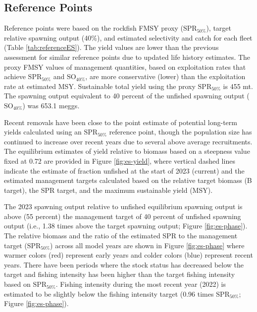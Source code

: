 \documentclass[11pt,
  english,
  letterpaper,
]{article}
\begin{document}
\hypertarget{reference-points}{%
\subsection*{Reference Points}\label{reference-points}}

Reference points were based on the rockfish FMSY proxy (\(\text{SPR}_{50\%}\)), target relative spawning output (40\%), and estimated selectivity and catch for each fleet (Table \ref{tab:referenceES}). The yield values are lower than the previous assessment for similar reference points due to updated life history estimates. The proxy FMSY values of management quantities, based on exploitation rates that achieve \(\text{SPR}_{50\%}\) and \(\text{SO}_{40\%}\), are more conservative (lower) than the exploitation rate at estimated MSY. Sustainable total yield using the proxy \(\text{SPR}_{50\%}\) is 455 mt. The spawning output equivalent to 40 percent of the unfished spawning output (\(\text{SO}_{40\%}\)) was 653.1 meggs.

Recent removals have been close to the point estimate of potential long-term yields calculated using an \(\text{SPR}_{50\%}\) reference point, though the population size has continued to increase over recent years due to several above average recruitments. The equilibrium estimates of yield relative to biomass based on a steepness value fixed at 0.72 are provided in Figure \ref{fig:es-yield}, where vertical dashed lines indicate the estimate of fraction unfished at the start of 2023 (current) and the estimated management targets calculated based on the relative target biomass (B target), the SPR target, and the maximum sustainable yield (MSY).

The 2023 spawning output relative to unfished equilibrium spawning output is above (55 percent) the management target of 40 percent of unfished spawning output (i.e., 1.38 times above the target spawning output; Figure \ref{fig:es-phase}). The relative biomass and the ratio of the estimated SPR to the management target (\(\text{SPR}_{50\%}\)) across all model years are shown in Figure \ref{fig:es-phase} where warmer colors (red) represent early years and colder colors (blue) represent recent years. There have been periods where the stock status has decreased below the target and fishing intensity has been higher than the target fishing intensity based on \(\text{SPR}_{50\%}\). Fishing intensity during the most recent year (2022) is estimated to be slightly below the fishing intensity target (0.96 times \(\text{SPR}_{50\%}\); Figure \ref{fig:es-phase}).
\end{document}

